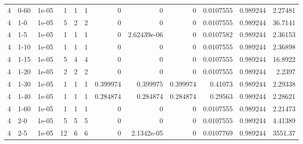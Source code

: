 \begin{tabular}{rlrrrrrrrrrr}
     4 & 0-60   &      1e-05 &           1 &                 1 &                 1 &     0           &     0           &      0           &        0.0107555 &               0.989244 &           2.27481  \\
     4 & 1-0    &      1e-05 &           5 &                 2 &                 2 &     0           &     0           &      0           &        0.0107555 &               0.989244 &          36.7141   \\
     4 & 1-5    &      1e-05 &           1 &                 1 &                 1 &     0           &     2.62439e-06 &      0           &        0.0107582 &               0.989244 &           2.36153  \\
     4 & 1-10   &      1e-05 &           1 &                 1 &                 1 &     0           &     0           &      0           &        0.0107555 &               0.989244 &           2.36898  \\
     4 & 1-15   &      1e-05 &           5 &                 4 &                 4 &     0           &     0           &      0           &        0.0107555 &               0.989244 &          16.8922   \\
     4 & 1-20   &      1e-05 &           2 &                 2 &                 2 &     0           &     0           &      0           &        0.0107555 &               0.989244 &           2.2397   \\
     4 & 1-30   &      1e-05 &           1 &                 1 &                 1 &     0.399974    &     0.399975    &      0.399974    &        0.41073   &               0.989244 &           2.29338  \\
     4 & 1-40   &      1e-05 &           1 &                 1 &                 1 &     0.284874    &     0.284874    &      0.284874    &        0.29563   &               0.989244 &           2.28621  \\
     4 & 1-60   &      1e-05 &           1 &                 1 &                 1 &     0           &     0           &      0           &        0.0107555 &               0.989244 &           2.21473  \\
     4 & 2-0    &      1e-05 &           5 &                 5 &                 5 &     0           &     0           &      0           &        0.0107555 &               0.989244 &           4.41389  \\
     4 & 2-5    &      1e-05 &          12 &                 6 &                 6 &     0           &     2.1342e-05  &      0           &        0.0107769 &               0.989244 &        3551.37     \\

\end{tabular}
